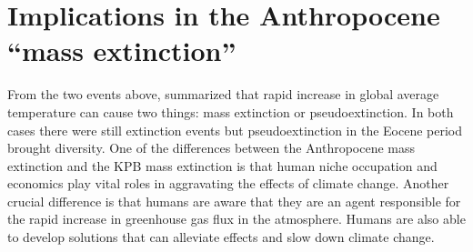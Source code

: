 \section{Implications in the Anthropocene ``mass extinction''}
From the two events above,  summarized that rapid increase in global average temperature can cause two things: mass extinction or pseudoextinction.
In both cases there were still extinction events but pseudoextinction in the Eocene period brought diversity.
One of the differences between the Anthropocene mass extinction and the KPB mass extinction is that human niche occupation and economics play vital roles in aggravating the effects of climate change.
Another crucial difference is that humans are aware that they are an agent responsible for the rapid increase in greenhouse gas flux in the atmosphere.
Humans are also able to develop solutions that can alleviate effects and slow down climate change.
